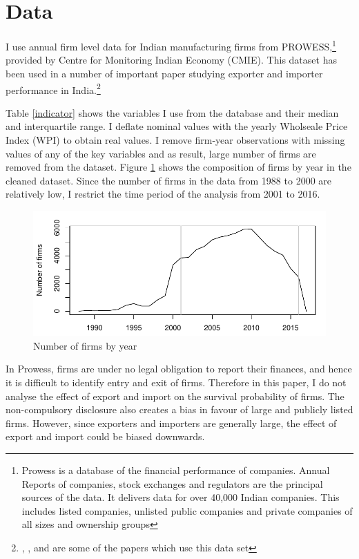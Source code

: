 \documentclass[12pt]{article}
\begin{document}
\section{Data}\label{sec:data}
I use annual firm level data for Indian manufacturing firms from
PROWESS,\footnote{Prowess is a database of the financial performance of
  companies. Annual Reports of companies, stock exchanges and
  regulators are the principal sources of the data. It delivers data for over 40,000 Indian companies. This includes listed companies, unlisted public companies and private companies of all sizes and ownership groups} provided by Centre for Monitoring Indian Economy
(CMIE). This dataset has been used in a number of important paper
studying exporter and importer performance in India.\footnote{
  \textcite{de2016prices}, \textcite{topalova2011trade}, \textcite{gupta2018exporting} and  \textcite{haidar2012trade} are
  some of the papers which use this data set}
\begin{center}

\end{center}
Table \ref{indicator}
shows the variables I use from the database and their median and
interquartile range.
I deflate nominal values with the yearly Wholseale Price
Index (WPI) to obtain real values. I remove firm-year observations
with missing values of any of the key variables and as result, large number of
firms are removed from the dataset. Figure \ref{compnfirms}  shows the composition of
firms by year in the cleaned dataset. Since the number of firms in the
data from 1988 to 2000 are relatively low, I restrict the time period of the analysis from 2001 to 2016.  
\begin{center}
\begin{figure}
\includegraphics{./TABLES/compnfirms.pdf}
\caption{Number of firms by year}
\label{compnfirms}
\end{figure}
\end{center}
In Prowess, firms
are under no legal obligation to report their finances, and hence it
is difficult to identify entry and exit of firms. Therefore in this
paper, I do not analyse the effect of export and import on
the survival probability of firms. The non-compulsory disclosure also
creates a bias in favour of large and publicly listed firms. However,
since exporters and importers are generally large, the effect of
export and import could
be biased downwards. 
\end{document}
